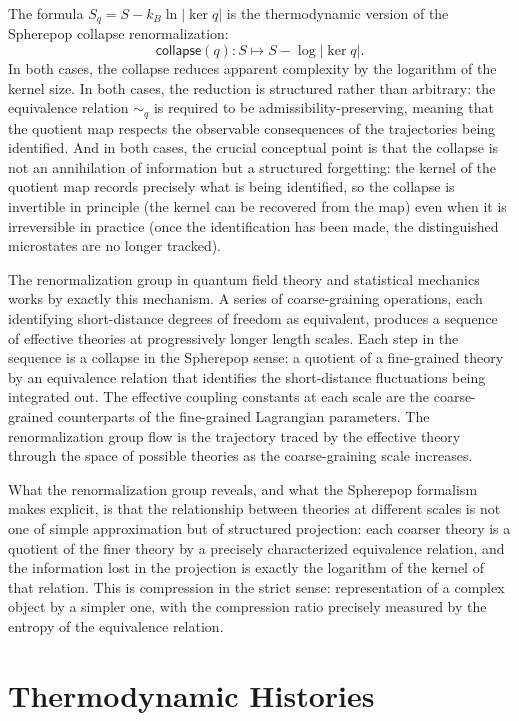 \documentclass[12pt,openany]{book}
\theoremstyle{plain}
\theoremstyle{definition}
\theoremstyle{remark}
\newcommand{\scollapse}[1]{\mathsf{collapse}\!\left(#1\right)}
\begin{document}
The formula $S_q = S - k_B \ln \lvert \ker q \rvert$ is the thermodynamic version of the Spherepop collapse renormalization:
\[
  \scollapse{q} : S \mapsto S - \log \lvert \ker q \rvert.
\]
In both cases, the collapse reduces apparent complexity by the logarithm of the kernel size. In both cases, the reduction is structured rather than arbitrary: the equivalence relation $\sim_q$ is required to be admissibility-preserving, meaning that the quotient map respects the observable consequences of the trajectories being identified. And in both cases, the crucial conceptual point is that the collapse is not an annihilation of information but a structured forgetting: the kernel of the quotient map records precisely what is being identified, so the collapse is invertible in principle (the kernel can be recovered from the map) even when it is irreversible in practice (once the identification has been made, the distinguished microstates are no longer tracked).

The renormalization group in quantum field theory and statistical mechanics works by exactly this mechanism. A series of coarse-graining operations, each identifying short-distance degrees of freedom as equivalent, produces a sequence of effective theories at progressively longer length scales. Each step in the sequence is a collapse in the Spherepop sense: a quotient of a fine-grained theory by an equivalence relation that identifies the short-distance fluctuations being integrated out. The effective coupling constants at each scale are the coarse-grained counterparts of the fine-grained Lagrangian parameters. The renormalization group flow is the trajectory traced by the effective theory through the space of possible theories as the coarse-graining scale increases.

What the renormalization group reveals, and what the Spherepop formalism makes explicit, is that the relationship between theories at different scales is not one of simple approximation but of structured projection: each coarser theory is a quotient of the finer theory by a precisely characterized equivalence relation, and the information lost in the projection is exactly the logarithm of the kernel of that relation. This is compression in the strict sense: representation of a complex object by a simpler one, with the compression ratio precisely measured by the entropy of the equivalence relation.

\section{Thermodynamic Histories}
\end{document}
